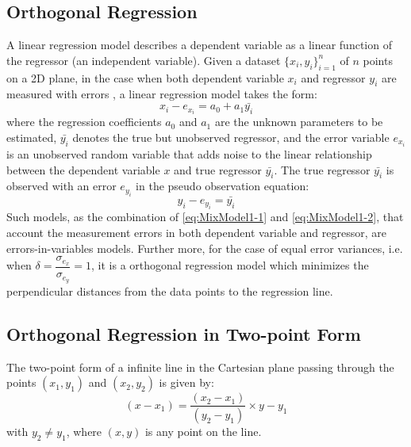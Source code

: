 \subsection{Orthogonal Regression}
\label{subsec:OrthogonalRegression}
A linear regression model describes a dependent variable as a linear function of the regressor (an independent variable). Given a dataset $\{x_i,y_i\}^n_{i=1}$ of $n$ points on a 2D plane, in the case when both dependent variable $x_i$ and regressor $y_i$ are measured with errors %
, a linear regression model takes the form:
\begin{equation} \label{eq:MixModel1-1}
x_i - e_{x_i} = %
a_0 + a_1\bar{y_i}
\end{equation}
where the regression coefficients $a_0$ and $a_1$ are the unknown parameters to be estimated, $\bar{y_i}$ denotes the true but unobserved regressor, and the error variable $e_{x_i}$ is an unobserved random variable that adds noise to the linear relationship between the dependent variable $x$ and true regressor $\bar{y_i}$. The true regressor $\bar{y_i}$ is observed with an error $e_{y_i}$ in the pseudo observation equation:
\begin{equation} \label{eq:MixModel1-2}
y_i-e_{y_i} = \bar{y_i}
\end{equation}
Such models, as the combination of \eqref{eq:MixModel1-1} and \eqref{eq:MixModel1-2}, that account the measurement errors in both dependent variable and regressor, are errors-in-variables models. Further more, for the case of equal error variances, i.e. when $\delta=\dfrac{\sigma_{e_x}}{\sigma_{e_y}}=1$, it is a orthogonal regression model which minimizes the %
perpendicular distances from the data points to the regression line.


\subsection{Orthogonal Regression in Two-point Form}
\label{subsec:NonLinear}

The two-point form of a infinite line in the Cartesian plane passing through the points $(x_1,y_1)$ and $(x_2,y_2)$ is given by:
\begin{equation} \label{eq:LineInTwoPointForm}
(x-x_1) = \dfrac{(x_2-x_1)}{(y_2-y_1)}\times y-y_1
\end{equation}
with $y_2\neq y_1$, where $(x,y)$ is any point on the line.

